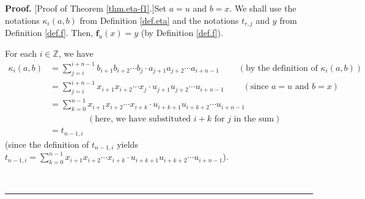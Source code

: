 \documentclass[numbers=enddot,12pt,final,onecolumn,notitlepage]{scrartcl}%
\theoremstyle{definition}
\newenvironment{proof}[1][Proof]{\noindent\textbf{#1.} }{\ \rule{0.5em}{0.5em}}
\let\sumnonlimits\sum
\renewcommand{\sum}{\sumnonlimits\limits}
\begin{document}
\begin{proof}
[Proof of Theorem \ref{thm.eta-f1}.]Set $a=u$ and $b=x$. We shall use the
notations $\kappa_{i}\left(  a,b\right)  $ from Definition \ref{def.eta} and
the notations $t_{r,j}$ and $y$ from Definition \ref{def.f}. Then,
$\mathbf{f}_{u}\left(  x\right)  =y$ (by Definition \ref{def.f}).

For each $i\in\mathbb{Z}$, we have%
\begin{align}
\kappa_{i}\left(  a,b\right)   &  =\sum_{j=i}^{i+n-1}b_{i+1}b_{i+2}\cdots
b_{j}\cdot a_{j+1}a_{j+2}\cdots a_{i+n-1}\ \ \ \ \ \ \ \ \ \ \left(  \text{by
the definition of }\kappa_{i}\left(  a,b\right)  \right) \nonumber\\
&  =\sum_{j=i}^{i+n-1}x_{i+1}x_{i+2}\cdots x_{j}\cdot u_{j+1}u_{j+2}\cdots
u_{i+n-1}\ \ \ \ \ \ \ \ \ \ \left(  \text{since }a=u\text{ and }b=x\right)
\nonumber\\
&  =\sum_{k=0}^{n-1}x_{i+1}x_{i+2}\cdots x_{i+k}\cdot u_{i+k+1}u_{i+k+2}\cdots
u_{i+n-1}\nonumber\\
&  \ \ \ \ \ \ \ \ \ \ \ \ \ \ \ \ \ \ \ \ \left(  \text{here, we have
substituted }i+k\text{ for }j\text{ in the sum}\right) \nonumber\\
&  =t_{n-1,i} \label{pf.thm.eta-f1.k=t}%
\end{align}
(since the definition of $t_{n-1,i}$ yields $t_{n-1,i}=\sum_{k=0}^{n-1}%
x_{i+1}x_{i+2}\cdots x_{i+k}\cdot u_{i+k+1}u_{i+k+2}\cdots u_{i+n-1}$).


\end{proof}
\end{document}
